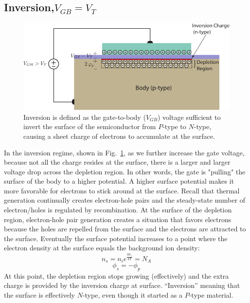 \subsection{Inversion\texorpdfstring{,\;$V_{GB}=V_T$}{}}
\begin{figure}[tbh]
\centering
\includegraphics[width=.75\columnwidth]{mos_cap_inversion}
\caption{Inversion is defined as the gate-to-body ($V_{GB}$) voltage sufficient to invert the surface of the semiconductor from $P$-type to $N$-type, causing a sheet charge of electrons to accumulate at the surface.}
\label{fig:mos_inv}
\end{figure}
In the inversion regime, shown in Fig.~\ref{fig:mos_inv}, as we further increase the gate voltage, because not all the charge resides at the surface, there is a larger and larger voltage drop across the depletion region.  In other words, the gate is "pulling" the surface of the body to a higher potential.  A higher surface potential makes it more favorable for electrons to stick around at the surface.  Recall that thermal generation continually creates electron-hole pairs and the steady-state number of electron/holes is regulated by recombination.  At the surface of the depletion region, electron-hole pair generation creates a situation that favors electrons because the holes are repelled from the surface and the electrons are attracted to the surface.  Eventually the surface potential increases to a point where the electron density at the surface equals the background ion density:
    \begin{equation}
        {n_s} = {n_i}{e^{\frac{{q{\phi _s}}}{{kT}}}} = {N_A}
    \end{equation}
    \begin{equation}
        {\phi _s} =  - {\phi _p}
    \end{equation}
At this point, the depletion region stops growing (effectively) and the extra charge is provided by the inversion charge at surface.  “Inversion” meaning that the surface is effectively $N$-type, even though it started as a $P$-type material.  
